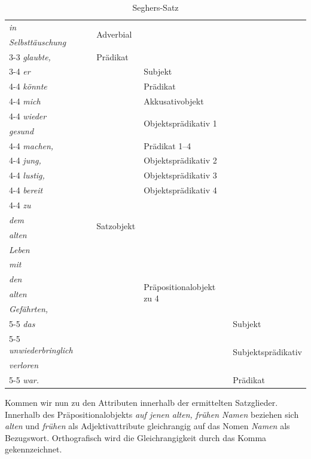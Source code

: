 \begin{table}
{\begin{tabular}{l|l|l|l|l}
    \textit{in} & & \multirow{2}{*}{Adverbial} & & \\ 
    \textit{Selbsttäuschung} & & & & \\ \cline{3-3}
    \textit{glaubte,} & & Prädikat & & \\ \cline{3-4}
    \textit{er} & & \multirow{21}{*}{Satzobjekt} & Subjekt & \\ \cline{4-4}
    \textit{könnte} & & & Prädikat & \\ \cline{4-4}
    \textit{mich} & & & Akkusativobjekt & \\ \cline{4-4}
    \textit{wieder} & & & \multirow{2}{*}{Objektsprädikativ 1} & \\ 
    \textit{gesund} & & & & \\ \cline{4-4}
    \textit{machen,} & & & Prädikat 1--4 \\ \cline{4-4}
    \textit{jung,} & & & Objektsprädikativ 2 & \\ \cline{4-4}
    \textit{lustig,} & & & Objektsprädikativ 3\\ \cline{4-4}
    \textit{bereit} & & & Objektsprädikativ 4 \\ \cline{4-4}
    \textit{zu} & & & \multirow{12}{*}{Präpositionalobjekt zu 4} & \\
    \textit{dem} & & & & \\
    \textit{alten} & & & & \\ 
    \textit{Leben} & & & & \\ 
    \textit{mit} & & & & \\ 
    \textit{den} & & & & \\
    \textit{alten} & & & & \\
    \textit{Gefährten,} & & & & \\ \cline{5-5}
    \textit{das} & & & & Subjekt \\ \cline{5-5}
    \textit{unwiederbringlich} & & & & \multirow{2}{*}{Subjektsprädikativ} \\
    \textit{verloren} & & & & \\ \cline{5-5}
    \textit{war.} & & & & Prädikat \\ 
    \hline 
  \end{tabular}
  }
  \caption{Seghers-Satz}
  \label{tab:Seghers_Satz}
\end{table}

Kommen wir nun zu den Attributen innerhalb der ermittelten Satzglieder. Innerhalb des Präpositionalobjekts \textit{auf jenen alten, frühen Namen} beziehen sich \textit{alten} und \textit{frühen} als Adjektivattribute gleichrangig auf das Nomen \textit{Namen} als Bezugswort. Orthografisch wird die Gleichrangigkeit durch das Komma gekennzeichnet. 

